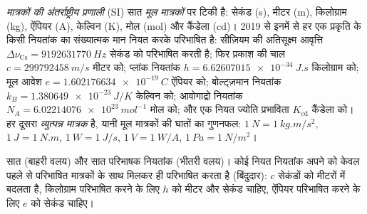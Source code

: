 \begin{definition}[SI के मूल मात्रक]\label{def:b1:units-dimensions:si}
\emph{मात्रकों की अंतर्राष्ट्रीय प्रणाली} (SI) सात \emph{मूल मात्रकों} पर
टिकी है: सेकंड (\unit{s}), मीटर (\unit{m}), किलोग्राम (\unit{kg}), ऐंपियर
(\unit{A}), केल्विन (\unit{K}), मोल (\unit{mol}) और कैंडेला (\unit{cd})।
2019 से इनमें से हर एक प्रकृति के किसी नियतांक का संख्यात्मक मान नियत करके
परिभाषित है: सीज़ियम की अतिसूक्ष्म आवृत्ति
$\Delta\nu_{\mathrm{Cs}} = \qty{9192631770}{Hz}$
सेकंड को परिभाषित करती है; फिर प्रकाश की चाल $c = \qty{299792458}{m/s}$
मीटर को; प्लांक नियतांक
$h = \qty{6.62607015e-34}{J.s}$ किलोग्राम को; मूल
आवेश $e = \qty{1.602176634e-19}{C}$ ऐंपियर को; बोल्ट्ज़मान नियतांक
$k_B = \qty{1.380649e-23}{J/K}$ केल्विन को; आवोगाद्रो नियतांक
$N_A = \qty{6.02214076e23}{mol^{-1}}$ मोल को; और एक नियत ज्योति
प्रभाविता $K_{\mathrm{cd}}$ कैंडेला को। हर दूसरा 
\emph{व्युत्पन्न मात्रक} है, यानी मूल मात्रकों की
घातों का गुणनफल: $\qty{1}{N} = \qty{1}{kg.m/s^2}$, $\qty{1}{J} = \qty{1}{N.m}$,
$\qty{1}{W} = \qty{1}{J/s}$, $\qty{1}{V} = \qty{1}{W/A}$,
$\qty{1}{Pa} = \qty{1}{N/m^2}$।
\end{definition}

\begin{omfigure}

{\small सात  (बाहरी वलय) और सात परिभाषक नियतांक (भीतरी वलय)। कोई
नियत नियतांक अपने  को केवल पहले से परिभाषित मात्रकों के साथ मिलकर ही
परिभाषित करता है (बिंदुदार): $c$ सेकंडों को मीटरों में बदलता है, किलोग्राम
परिभाषित करने के लिए $h$ को मीटर और सेकंड चाहिए, ऐंपियर परिभाषित करने के लिए
$e$ को सेकंड चाहिए।}
\end{omfigure}

